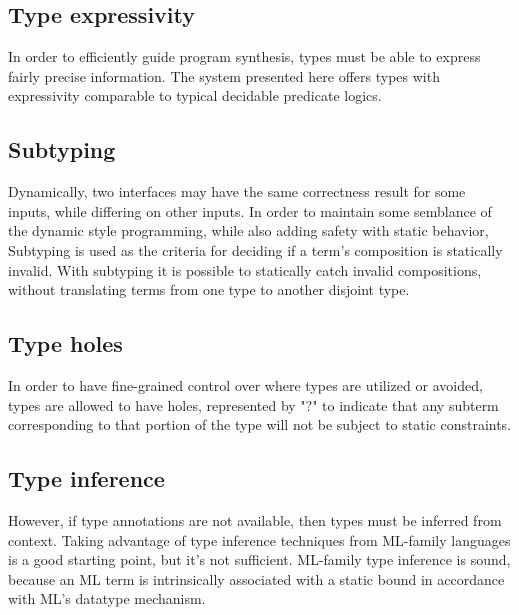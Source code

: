 \documentclass[]{acmart}
\begin{document}
\subsection*{Type expressivity}
In order to efficiently guide program synthesis, types must be able to express 
fairly precise information. 
The system presented here offers types with 
expressivity comparable to typical decidable predicate logics. 

\subsection*{Subtyping}
Dynamically, two interfaces may have the same correctness result for some inputs,
while differing on other inputs.  
In order to maintain some semblance of the dynamic style programming,
while also adding safety with static behavior,  
Subtyping is used as the criteria for deciding if a term's 
composition is statically invalid.   
With subtyping it is possible to statically catch invalid compositions,
without translating terms from one type to another disjoint type.


\subsection*{Type holes}
In order to have fine-grained control over where types are utilized or avoided, 
types are allowed to have holes, represented by "?" to indicate that any subterm corresponding to that
portion of the type will not be subject to static constraints.

\subsection*{Type inference}
However, if type annotations are not available, then types must be inferred from context. 
Taking advantage of type inference techniques from ML-family languages is a good starting point,
but it's not sufficient. ML-family type inference is sound, because an ML term is 
intrinsically associated with a static bound in accordance with ML's datatype mechanism.
\end{document}
